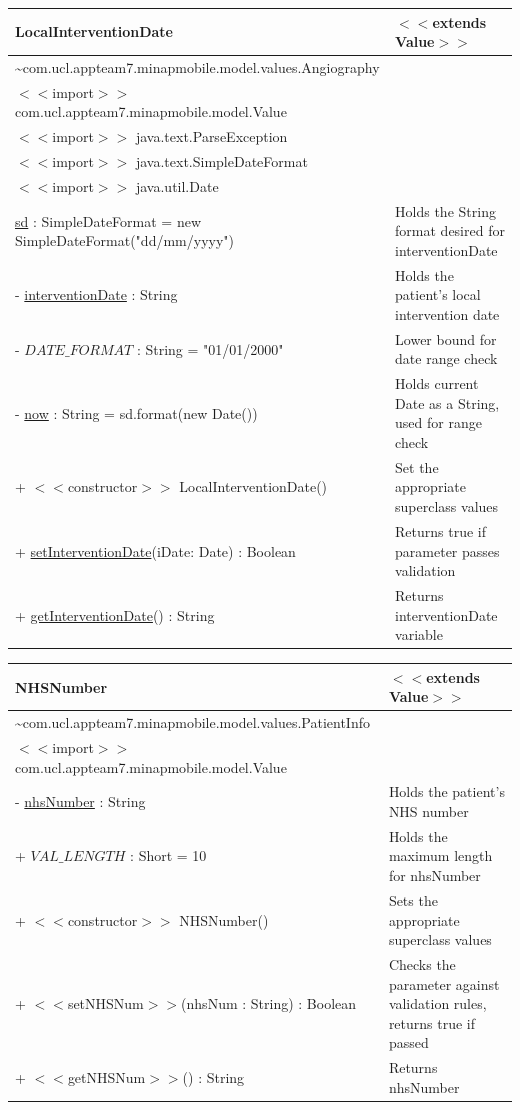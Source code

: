 \documentclass[12pt,a4paper,oneside,titlepage]{article}
\begin{document}
\begin{center}
	\begin{tabular}{| p{13cm} | p{5cm} |}
	\hline
	\textbf{LocalInterventionDate} & \textbf{$<<$extends Value$>>$} \\ \hline
	\textasciitilde com.ucl.appteam7.minapmobile.model.values.Angiography & \\ \hline
	$<<$import$>>$ com.ucl.appteam7.minapmobile.model.Value & \\ \hline
	$<<$import$>>$ java.text.ParseException & \\ \hline
	$<<$import$>>$ java.text.SimpleDateFormat & \\ \hline
	$<<$import$>>$ java.util.Date & \\ \hline \hline
	\underline{sd} : SimpleDateFormat = new SimpleDateFormat("dd/mm/yyyy") & Holds the String format desired for interventionDate \\ \hline
	- \underline{interventionDate} : String & Holds the patient's local intervention date \\ \hline
	- \underline{$DATE\_FORMAT$} : String = "01/01/2000" & Lower bound for date range check \\ \hline
	- \underline{now} : String = sd.format(new Date()) & Holds current Date as a String, used for range check \\ \hline \hline
	+ $<<$constructor$>>$ LocalInterventionDate() & Set the appropriate superclass values \\ \hline
	+ \underline{setInterventionDate}(iDate: Date) : Boolean & Returns true if parameter passes validation \\ \hline
	+ \underline{getInterventionDate}() : String & Returns interventionDate variable \\ \hline
	\end{tabular}
\end{center}

\begin{center}
	\begin{tabular}{| p{13cm} | p{5cm} |}
	\hline
	\textbf{NHSNumber} & \textbf{$<<$extends Value$>>$} \\ \hline
	\textasciitilde com.ucl.appteam7.minapmobile.model.values.PatientInfo & \\ \hline
	$<<$import$>>$ com.ucl.appteam7.minapmobile.model.Value & \\ \hline \hline
	- \underline{nhsNumber} : String & Holds the patient's NHS number \\ \hline
	+ \underline{$VAL\_LENGTH$} : Short = 10 & Holds the maximum length for nhsNumber \\ \hline \hline
	+ $<<$constructor$>>$ NHSNumber() & Sets the appropriate superclass values \\ \hline
	+ $<<$setNHSNum$>>$(nhsNum : String) : Boolean & Checks the parameter against validation rules, returns true if passed \\ \hline
	+ $<<$getNHSNum$>>$() : String & Returns nhsNumber \\ \hline
	\end{tabular}
\end{center}
\end{document}
